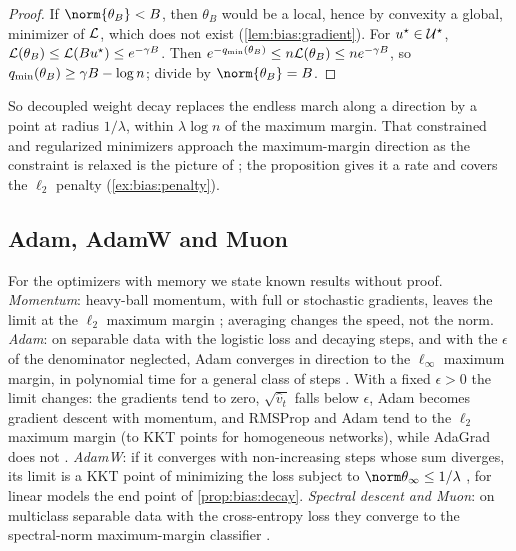 \begin{refsection}
\begin{proof}
If $\norm{\theta_B}<B$, then $\theta_B$ would be a local, hence by convexity a global, minimizer of $\mathcal{L}$, which does not exist (\cref{lem:bias:gradient}). For $u^\star\in\mathcal{U}^\star$, $\mathcal{L}(\theta_B)\le\mathcal{L}(Bu^\star)\le e^{-\gamma B}$. Then $e^{-q_{\min}(\theta_B)}\le n\mathcal{L}(\theta_B)\le ne^{-\gamma B}$, so $q_{\min}(\theta_B)\ge\gamma B-\log n$; divide by $\norm{\theta_B}=B$.
\end{proof}

So decoupled weight decay replaces the endless march along a direction by a point at radius $1/\lambda$, within $\lambda\log n$ of the maximum margin. That constrained and regularized minimizers approach the maximum-margin direction as the constraint is relaxed is the  picture of \textcite{RossetZhuHastie2004}; the proposition gives it a rate and covers the $\ell_2$ penalty (\cref{ex:bias:penalty}).

\subsection{Adam, AdamW and Muon}

For the optimizers with memory we state known results without proof. \emph{Momentum}: heavy-ball momentum, with full or stochastic gradients, leaves the limit at the $\ell_2$ maximum margin \parencite{WangEtAl2022}; averaging changes the speed, not the norm. \emph{Adam}: on separable data with the logistic loss and decaying steps, and with the $\epsilon$ of the denominator neglected, Adam converges in direction to the $\ell_\infty$ maximum margin, in polynomial time for a general class of steps \parencite{ZhangZouCao2024}. With a fixed $\epsilon>0$ the limit changes: the gradients tend to zero, $\sqrt{\hat v_t}$ falls below $\epsilon$, Adam becomes gradient descent with momentum, and RMSProp and Adam tend to the $\ell_2$ maximum margin (to KKT points for homogeneous networks), while AdaGrad does not \parencite{WangEtAl2021,WangEtAl2022}. \emph{AdamW}: if it converges with non-increasing steps whose sum diverges, its limit is a KKT point of minimizing the loss subject to $\norm\theta_\infty\le1/\lambda$ \parencite{XieLi2024}, for linear models the end point of \cref{prop:bias:decay}. \emph{Spectral descent and Muon}: on multiclass separable data with the cross-entropy loss they converge to the spectral-norm maximum-margin classifier \parencite{FanSchmidtThrampoulidis2025}.


\end{refsection}
